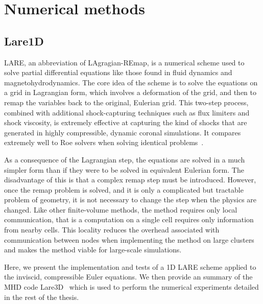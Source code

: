 \chapter{Numerical methods}

\graphicspath{{images/numerical_methods/}}

\section{Lare1D}

LARE, an abbreviation of LAgragian-REmap, is a numerical scheme used to solve partial differential equations like those found in fluid dynamics and magnetohydrodynamics. The core idea of the scheme is to solve the equations on a grid in Lagrangian form, which involves a deformation of the grid, and then to remap the variables back to the original, Eulerian grid. This two-step process, combined with additional shock-capturing techniques such as flux limiters and shock viscosity, is extremely effective at capturing the kind of shocks that are generated in highly compressible, dynamic coronal simulations. It compares extremely well to Roe solvers when solving identical problems~\cite{arberStaggeredGridLagrangian2001}.

As a consequence of the Lagrangian step, the equations are solved in a much simpler form than if they were to be solved in equivalent Eulerian form. The disadvantage of this is that a complex remap step must be introduced. However, once the remap problem is solved, and it is only a complicated but tractable problem of geometry, it is not necessary to change the step when the physics are changed. Like other finite-volume methods, the method requires only local communication, that is a computation on a single cell requires only information from nearby cells. This locality reduces the overhead associated with communication between nodes when implementing the method on large clusters and makes the method viable for large-scale simulations. 

Here, we present the implementation and tests of a 1D LARE scheme applied to the inviscid, compressible Euler equations. We then provide an summary of the MHD code Lare3D~\cite{arberStaggeredGridLagrangian2001} which is used to perform the numerical experiments detailed in the rest of the thesis. 

